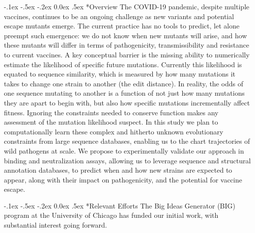 \documentclass[onecolumn, compsoc,12pt]{IEEEtran}
\makeatletter
\renewcommand\paragraph{\@startsection {section}{1}{\z@}%
                                   {-.1ex \@plus -.5ex \@minus -.2ex}%
                                   {0.0ex \@plus.5ex}%
                                   {\fontsize{11}{10}\selectfont\bfseries\itshape\sffamily\color{black}}}
\def\cov{COVID-19\xspace}
\makeatother
\begin{document}
\paragraph*{Overview} The \cov pandemic, despite multiple vaccines, continues to be an ongoing challenge as new variants and potential escape mutants emerge. The current practice has no tools to predict, let alone preempt such emergence: we do not know when  new mutants  will arise, and how these mutants will differ in terms of pathogenicity, transmissibility and resistance to current vaccines.  A key conceptual barrier  is the missing ability to numerically estimate the likelihood of specific future mutations. Currently this likelihood is  equated to sequence similarity, which is measured by how many mutations it takes to change one strain to another (the edit distance). In reality, the odds of one sequence mutating to another is a function of not just how many mutations they are apart to begin with, but also how specific mutations incrementally affect fitness. Ignoring the constraints needed to conserve function makes any assessment of the mutation likelihood suspect. In this study we plan to computationally learn these complex and hitherto unknown evolutionary constraints from large sequence databases, enabling us to the chart   trajectories of wild pathogens at scale. We propose to experimentally validate our approach  in binding and neutralization assays,  allowing us to leverage  sequence and structural  annotation databases, to predict when and how new strains are expected to appear, along with their  impact on pathogenicity, and the potential for vaccine escape. %

\paragraph*{Relevant Efforts} The  Big Ideas Generator (BIG) program at the University of Chicago  has funded our initial work, with  substantial interest going forward.
\end{document}
